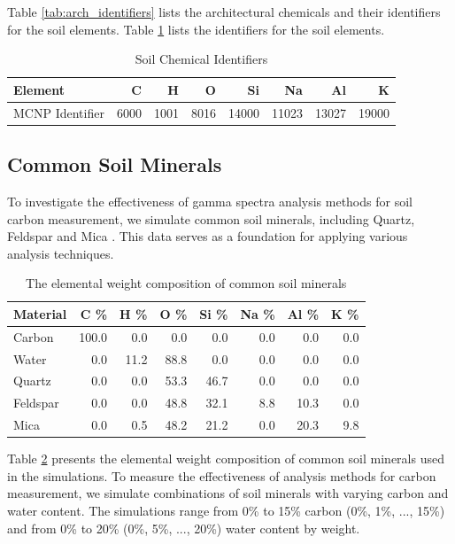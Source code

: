 \documentclass[preprint, 12pt, authoryear]{elsarticle}
\begin{document}
Table \ref{tab:arch_identifiers} lists the architectural chemicals and their identifiers for the soil elements. Table \ref{tab:chemical_identifiers} lists the identifiers for the soil elements.

\begin{table}[H]
    \centering
    \caption{Soil Chemical Identifiers}
    \label{tab:chemical_identifiers}
    \begin{tabular}{lrrrrrrr}
    \hline
    Element         &    C &    H &    O &    Si &    Na &    Al &     K \\
    \hline
    MCNP Identifier & 6000 & 1001 & 8016 & 14000 & 11023 & 13027 & 19000 \\
    \hline
    \end{tabular}
\end{table}

\subsection{Common Soil Minerals}

To investigate the effectiveness of gamma spectra analysis methods for soil carbon measurement, we simulate common soil minerals, including Quartz, Feldspar and Mica \cite{sposito_chemistry_2008}. This data serves as a foundation for applying various analysis techniques.

\begin{table}[H]
\centering
\caption{The elemental weight composition of common soil minerals}
\label{tab:materials}
\begin{tabular}{l @{\extracolsep{\fill}} rrrrrrr}
\hline
 Material   &   C \% &   H \% &   O \% &   Si \% &   Na \% &   Al \% &   K \% \\
\hline
 Carbon     & 100.0 &   0.0 &   0.0 &    0.0 &    0.0 &    0.0 &   0.0 \\
 Water      &   0.0 &  11.2 &  88.8 &    0.0 &    0.0 &    0.0 &   0.0 \\
 Quartz     &   0.0 &   0.0 &  53.3 &   46.7 &    0.0 &    0.0 &   0.0 \\
 Feldspar   &   0.0 &   0.0 &  48.8 &   32.1 &    8.8 &   10.3 &   0.0 \\
 Mica       &   0.0 &   0.5 &  48.2 &   21.2 &    0.0 &   20.3 &   9.8 \\
\hline
\end{tabular}
\end{table}

Table \ref{tab:materials} presents the elemental weight composition of common soil minerals used in the simulations. To measure the effectiveness of analysis methods for carbon measurement, we simulate combinations of soil minerals with varying carbon and water content. The simulations range from 0\% to 15\% carbon (0\%, 1\%, ..., 15\%) and from 0\% to 20\% (0\%, 5\%, ..., 20\%) water content by weight.
\end{document}
